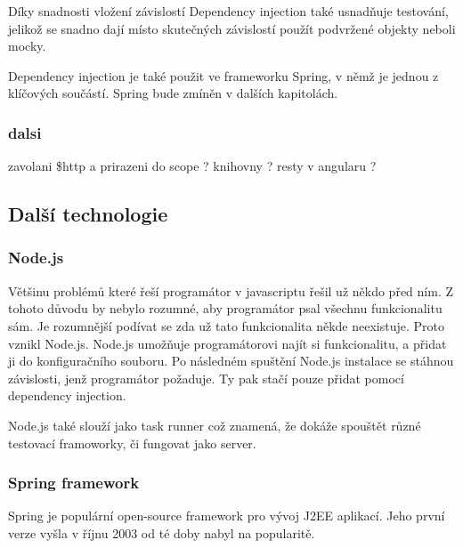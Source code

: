 \documentclass[czech,master,public,dept460,male,cpdeclaration,twoside]{diploma}
\begin{document}
Díky snadnosti vložení závislostí Dependency injection také usnadňuje testování, jelikož se snadno dají místo skutečných závislostí použít podvržené objekty neboli mocky.

Dependency injection je také použit ve frameworku Spring, v němž je jednou z klíčových součástí. Spring bude zmíněn v dalších kapitolách. \cite{LearningAngularjs}

\subsubsection{dalsi}
zavolani \$http a prirazeni do scope ? knihovny ? resty v angularu ?

\subsection{Další technologie}

\subsubsection{Node.js}
Většinu problémů které řeší programátor v javascriptu řešil už někdo před ním. Z tohoto důvodu by nebylo rozumné, aby programátor psal všechnu funkcionalitu sám. Je rozumnější podívat se zda už tato funkcionalita někde neexistuje. Proto vznikl Node.js. Node.js umožňuje programátorovi najít si funkcionalitu, a přidat ji do konfiguračního souboru. Po následném spuštění Node.js instalace se stáhnou závislosti, jenž programátor požaduje. Ty pak stačí pouze přidat pomocí dependency injection.

Node.js také slouží jako task runner což znamená, že dokáže spouštět různé testovací framoworky, či fungovat jako server.

\subsubsection{Spring framework}
Spring je populární open-source framework pro vývoj J2EE aplikací. Jeho první verze vyšla v říjnu 2003 od té doby nabyl na popularitě. 
\end{document}
